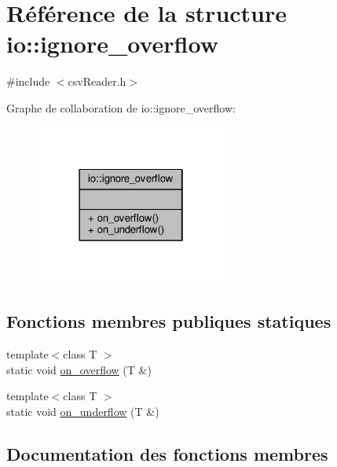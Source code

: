 \hypertarget{structio_1_1ignore__overflow}{}\section{Référence de la structure io\+:\+:ignore\+\_\+overflow}
\label{structio_1_1ignore__overflow}


{\ttfamily \#include $<$csv\+Reader.\+h$>$}



Graphe de collaboration de io\+:\+:ignore\+\_\+overflow\+:
\nopagebreak
\begin{figure}[H]
\begin{center}
\leavevmode
\includegraphics[width=178pt]{structio_1_1ignore__overflow__coll__graph}
\end{center}
\end{figure}
\subsection*{Fonctions membres publiques statiques}
\begin{DoxyCompactItemize}
\item 
{\footnotesize template$<$class T $>$ }\\static void \hyperlink{structio_1_1ignore__overflow_aed3e5026cfa7157ea9270ae377d1026b}{on\+\_\+overflow} (T \&)
\item 
{\footnotesize template$<$class T $>$ }\\static void \hyperlink{structio_1_1ignore__overflow_aece692f7a20933149ec99aa1f97458ad}{on\+\_\+underflow} (T \&)
\end{DoxyCompactItemize}


\subsection{Documentation des fonctions membres}
\mbox{\label{structio_1_1ignore__overflow_aed3e5026cfa7157ea9270ae377d1026b}} 
